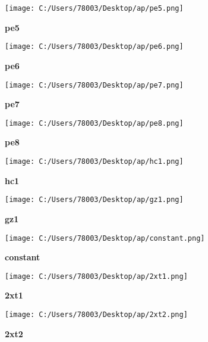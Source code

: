 \documentclass[UTF8]{report}
\theoremstyle{MyLineTheoremStyle} %
\theoremstyle{MyBlockTheoremStyle} %
\theoremstyle{MySubsubsectionStyle} %
\begin{document}
\begin{figure}[ht]
    \centering
    \texttt{[image: C:/Users/78003/Desktop/ap/pe5.png]}
    \caption{\textbf{pe5}}
    \label{fig:pe5}
\end{figure}

\begin{figure}[ht]
    \centering
    \texttt{[image: C:/Users/78003/Desktop/ap/pe6.png]}
    \caption{\textbf{pe6}}
    \label{fig:pe6}
\end{figure}

\begin{figure}[ht]
    \centering
    \texttt{[image: C:/Users/78003/Desktop/ap/pe7.png]}
    \caption{\textbf{pe7}}
    \label{fig:pe7}
\end{figure}

\begin{figure}[ht]
    \centering
    \texttt{[image: C:/Users/78003/Desktop/ap/pe8.png]}
    \caption{\textbf{pe8}}
    \label{fig:pe8}
\end{figure}

\begin{figure}[ht]
    \centering
    \texttt{[image: C:/Users/78003/Desktop/ap/hc1.png]}
    \caption{\textbf{hc1}}
    \label{fig:hc1}
\end{figure}

\begin{figure}[ht]
    \centering
    \texttt{[image: C:/Users/78003/Desktop/ap/gz1.png]}
    \caption{\textbf{gz1}}
    \label{fig:gz1}
\end{figure}

\begin{figure}[ht]
    \centering
    \texttt{[image: C:/Users/78003/Desktop/ap/constant.png]}
    \caption{\textbf{constant}}
    \label{fig:constant}
\end{figure}

\begin{figure}[ht]
    \centering
    \texttt{[image: C:/Users/78003/Desktop/ap/2xt1.png]}
    \caption{\textbf{2xt1}}
    \label{fig:2xt1}
\end{figure}

\begin{figure}[ht]
    \centering
    \texttt{[image: C:/Users/78003/Desktop/ap/2xt2.png]}
    \caption{\textbf{2xt2}}
    \label{fig:2xt2}
\end{figure}
\end{document}
